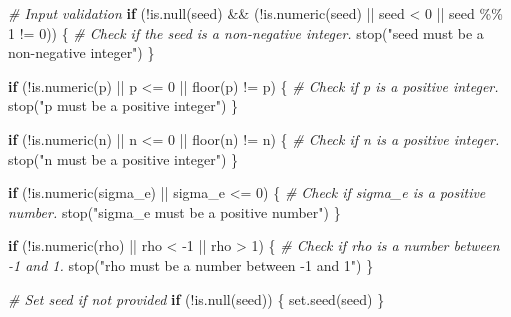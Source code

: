 \documentclass[
  11pt,
]{article}
\newenvironment{Shaded}{}{}
\newcommand{\CommentTok}[1]{\textcolor[rgb]{0.38,0.63,0.69}{\textit{#1}}}
\newcommand{\ControlFlowTok}[1]{\textcolor[rgb]{0.00,0.44,0.13}{\textbf{#1}}}
\newcommand{\DecValTok}[1]{\textcolor[rgb]{0.25,0.63,0.44}{#1}}
\newcommand{\FunctionTok}[1]{\textcolor[rgb]{0.02,0.16,0.49}{#1}}
\newcommand{\NormalTok}[1]{#1}
\newcommand{\SpecialCharTok}[1]{\textcolor[rgb]{0.25,0.44,0.63}{#1}}
\newcommand{\StringTok}[1]{\textcolor[rgb]{0.25,0.44,0.63}{#1}}
\begin{document}
\begin{Shaded}
\begin{Highlighting}[]
  \CommentTok{\# Input validation}
  \ControlFlowTok{if}\NormalTok{ (}\SpecialCharTok{!}\FunctionTok{is.null}\NormalTok{(seed) }\SpecialCharTok{\&\&}\NormalTok{ (}\SpecialCharTok{!}\FunctionTok{is.numeric}\NormalTok{(seed) }\SpecialCharTok{||}\NormalTok{ seed }\SpecialCharTok{\textless{}} \DecValTok{0} \SpecialCharTok{||}\NormalTok{ seed }\SpecialCharTok{\%\%} \DecValTok{1} \SpecialCharTok{!=} \DecValTok{0}\NormalTok{)) \{}
    \CommentTok{\# Check if the seed is a non{-}negative integer.}
    \FunctionTok{stop}\NormalTok{(}\StringTok{"seed must be a non{-}negative integer"}\NormalTok{)}
\NormalTok{  \}}
  
  \ControlFlowTok{if}\NormalTok{ (}\SpecialCharTok{!}\FunctionTok{is.numeric}\NormalTok{(p) }\SpecialCharTok{||}\NormalTok{ p }\SpecialCharTok{\textless{}=} \DecValTok{0} \SpecialCharTok{||} \FunctionTok{floor}\NormalTok{(p) }\SpecialCharTok{!=}\NormalTok{ p) \{}
    \CommentTok{\# Check if p is a positive integer.}
    \FunctionTok{stop}\NormalTok{(}\StringTok{"p must be a positive integer"}\NormalTok{)}
\NormalTok{  \}}
  
  \ControlFlowTok{if}\NormalTok{ (}\SpecialCharTok{!}\FunctionTok{is.numeric}\NormalTok{(n) }\SpecialCharTok{||}\NormalTok{ n }\SpecialCharTok{\textless{}=} \DecValTok{0} \SpecialCharTok{||} \FunctionTok{floor}\NormalTok{(n) }\SpecialCharTok{!=}\NormalTok{ n) \{}
    \CommentTok{\# Check if n is a positive integer.}
    \FunctionTok{stop}\NormalTok{(}\StringTok{"n must be a positive integer"}\NormalTok{)}
\NormalTok{  \}}
  
  \ControlFlowTok{if}\NormalTok{ (}\SpecialCharTok{!}\FunctionTok{is.numeric}\NormalTok{(sigma\_e) }\SpecialCharTok{||}\NormalTok{ sigma\_e }\SpecialCharTok{\textless{}=} \DecValTok{0}\NormalTok{) \{}
    \CommentTok{\# Check if sigma\_e is a positive number.}
    \FunctionTok{stop}\NormalTok{(}\StringTok{"sigma\_e must be a positive number"}\NormalTok{)}
\NormalTok{  \}}
  
  \ControlFlowTok{if}\NormalTok{ (}\SpecialCharTok{!}\FunctionTok{is.numeric}\NormalTok{(rho) }\SpecialCharTok{||}\NormalTok{ rho }\SpecialCharTok{\textless{}} \SpecialCharTok{{-}}\DecValTok{1} \SpecialCharTok{||}\NormalTok{ rho }\SpecialCharTok{\textgreater{}} \DecValTok{1}\NormalTok{) \{}
    \CommentTok{\# Check if rho is a number between {-}1 and 1.}
    \FunctionTok{stop}\NormalTok{(}\StringTok{"rho must be a number between {-}1 and 1"}\NormalTok{)}
\NormalTok{  \}}
  
  \CommentTok{\# Set seed if not provided}
  \ControlFlowTok{if}\NormalTok{ (}\SpecialCharTok{!}\FunctionTok{is.null}\NormalTok{(seed)) \{}
    \FunctionTok{set.seed}\NormalTok{(seed)}
\NormalTok{  \}}
  

\end{Highlighting}
\end{Shaded}
\end{document}
